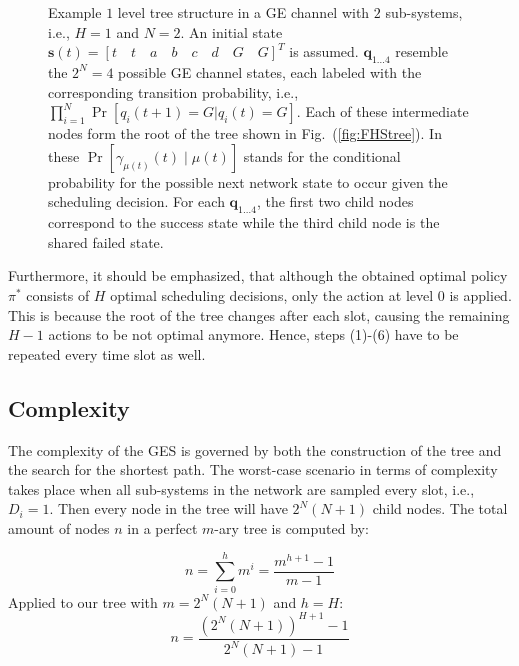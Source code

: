\begin{sidewaysfigure}
	\centering
   
  \caption[GES: Example tree structure with 2 sub-systems and finite horizon
  1]{Example $1$ level tree structure in a GE channel with $2$ sub-systems,
  i.e., $H=1$ and $N=2$. An initial state $\boldsymbol{s}(t)=\left[t\quad t\quad
  a\quad b\quad c\quad d\quad G\quad G \right]^T$ is assumed. $\boldsymbol{q}_
  {1\dots 4}$ resemble the $2^N=4$ possible GE channel states, each labeled with
  the corresponding transition probability, i.e., $\prod_{i=1}^{N}{\Pr[q_i(t+1)
  = G|q_i(t)=G]}$. Each of these intermediate nodes form the root of the tree
  shown in Fig.~(\ref{fig:FHStree}). In these $\Pr[\gamma_{\mu(t)}(t)\mid
  \mu(t)]$ stands for the conditional probability for the possible next network
  state to occur given the scheduling decision. For each $\boldsymbol{q}_{1\dots
  4}$, the first two child nodes correspond to the success state while the third
  child node is the shared failed state.}
	\label{fig:GEStree}
\end{sidewaysfigure}

Furthermore, it should be emphasized, that although the obtained optimal policy
$\pi^*$ consists of $H$ optimal scheduling decisions, only the action at level 0
is applied. This is because the root of the tree changes after each slot,
causing the remaining $H-1$ actions to be not optimal anymore. Hence, steps
(1)-(6) have to be repeated every time slot as well. 

\subsection{Complexity}

The complexity of the GES is governed by both the construction of the tree and
the search for the shortest path. The worst-case scenario in terms of complexity
takes place when all sub-systems in the network are sampled every slot, i.e.,
$D_i=1$. Then every node in the tree will have $2^N(N+1)$ child nodes. The total
amount of nodes $n$ in a perfect $m$-ary tree is computed by:

\begin{equation}
  n = \sum_{i=0}^{h}m^i = \frac{m^{h+1}-1}{m-1}
\end{equation}
Applied to our tree with $m=2^N(N+1)$ and $h=H$: 
\begin{equation}
  n = \frac{(2^N(N+1))^{H+1}-1}{2^N(N+1)-1} 
\end{equation} 

